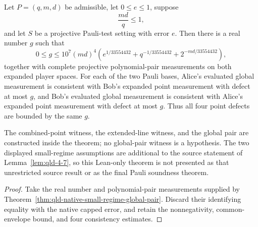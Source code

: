 \begin{theorem}
\label{thm:qld-small-regime-global-pair}
\leanok
{}
Let $P=(q,m,d)$ be admissible, let $0\leq e\leq1$, suppose
\[
 \frac{md}{q}\leq1,
\]
and let $S$ be a projective Pauli-test setting with error $e$. Then there is
a real number $g$ such that
\[
 0\leq g\leq10^7(md)^4
 \left(e^{1/33554432}+q^{-1/33554432}
       +2^{-md/33554432}\right),
\]
together with complete projective polynomial-pair measurements on both
expanded player spaces. For each of the two Pauli bases, Alice's evaluated
global measurement is consistent with Bob's expanded point measurement with
defect at most $g$, and Bob's evaluated global measurement is consistent with
Alice's expanded point measurement with defect at most $g$. Thus all four
point defects are bounded by the same $g$.

The combined-point witness, the extended-line witness, and the global pair are
constructed inside the theorem; no global-pair witness is a hypothesis. The
two displayed small-regime assumptions are additional to the source statement
of Lemma~\ref{lem:qld-4-7}, so this Lean-only theorem is not presented as that
unrestricted source result or as the final Pauli soundness theorem.
\end{theorem}
\begin{proof}
\leanok
{}
Take the real number and polynomial-pair measurements supplied by
Theorem~\ref{thm:qld-native-small-regime-global-pair}.  Discard their
identifying equality with the native capped error, and retain the
nonnegativity, common-envelope bound, and four consistency estimates.
\end{proof}
